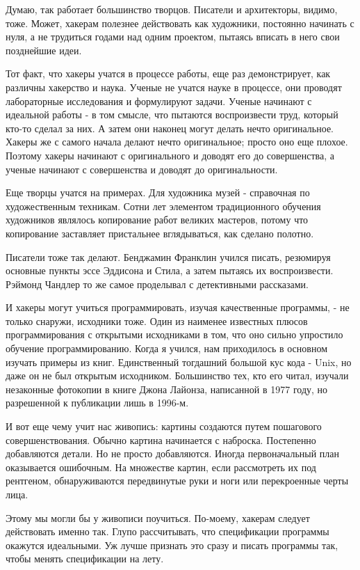 \documentclass[ebook,12pt,oneside,openany]{memoir}
\begin{document}
Думаю, так работает большинство творцов. Писатели и архитекторы,
видимо, тоже. Может, хакерам полезнее действовать как художники,
постоянно начинать с нуля, а не трудиться годами над одним проектом,
пытаясь вписать в него свои позднейшие идеи.

Тот факт, что хакеры учатся в процессе работы, еще раз демонстрирует,
как различны хакерство и наука. Ученые не учатся науке в процессе, они
проводят лабораторные исследования и формулируют задачи. Ученые
начинают с идеальной работы - в том смысле, что пытаются воспроизвести
труд, который кто-то сделал за них. А затем они наконец могут делать
нечто оригинальное. Хакеры же с самого начала делают нечто
оригинальное; просто оно еще плохое. Поэтому хакеры начинают с
оригинального и доводят его до совершенства, а ученые начинают с
совершенства и доводят до оригинальности.

Еще творцы учатся на примерах. Для художника музей - справочная по
художественным техникам. Сотни лет элементом традиционного обучения
художников являлось копирование работ великих мастеров, потому что
копирование заставляет пристальнее вглядываться, как сделано полотно.

Писатели тоже так делают. Бенджамин Франклин учился писать, резюмируя
основные пункты эссе Эддисона и Стила, а затем пытаясь их
воспроизвести. Рэймонд Чандлер то же самое проделывал с детективными
рассказами.

И хакеры могут учиться программировать, изучая качественные программы,
- не только снаружи, исходники тоже. Один из наименее известных плюсов
программирования с открытыми исходниками в том, что оно сильно
упростило обучение программированию. Когда я учился, нам приходилось в
основном изучать примеры из книг. Единственный тогдашний большой кус
кода - Unix, но даже он не был открытым исходником. Большинство тех,
кто его читал, изучали незаконные фотокопии в книге Джона Лайонза,
написанной в 1977 году, но разрешенной к публикации лишь в 1996-м.

И вот еще чему учит нас живопись: картины создаются путем пошагового
совершенствования. Обычно картина начинается с наброска. Постепенно
добавляются детали. Но не просто добавляются. Иногда первоначальный
план оказывается ошибочным. На множестве картин, если рассмотреть их
под рентгеном, обнаруживаются передвинутые руки и ноги или
перекроенные черты лица.

Этому мы могли бы у живописи поучиться. По-моему, хакерам следует
действовать именно так. Глупо рассчитывать, что спецификации программы
окажутся идеальными. Уж лучше признать это сразу и писать программы
так, чтобы менять спецификации на лету.
\end{document}
